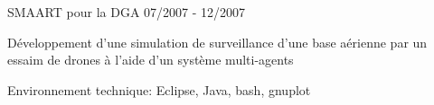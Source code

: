 \begin{cventries}
  \cventry
    {SMAART pour la DGA}
    {}
    {}
    {07/2007 - 12/2007}
    {
      \begin{cvitems}
        \item {Développement d'une simulation de surveillance d’une base 
			   aérienne par un essaim de drones à l’aide d’un système 
			   multi-agents}
        \item {Environnement technique: Eclipse, Java, bash, gnuplot}
      \end{cvitems}
    }

\end{cventries}
